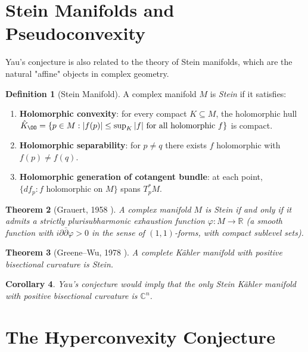 \documentclass[12pt,a4paper]{amsart}
\newtheorem{theorem}{Theorem}[section]
\newtheorem{corollary}[theorem]{Corollary}
\theoremstyle{definition}
\newtheorem{definition}[theorem]{Definition}
\theoremstyle{remark}
\newcommand{\CC}{\mathbb{C}}
\newcommand{\RR}{\mathbb{R}}
\newcommand{\dd}{\partial}
\begin{document}
\section{Stein Manifolds and Pseudoconvexity}

Yau's conjecture is also related to the theory of Stein manifolds, which are
the natural "affine" objects in complex geometry.

\begin{definition}[Stein Manifold]
A complex manifold $M$ is \emph{Stein} if it satisfies:
\begin{enumerate}[label=(\roman*)]
  \item \textbf{Holomorphic convexity}: for every compact $K \subseteq M$,
        the holomorphic hull $\hat K_\OO = \{p \in M : |f(p)| \le \sup_K |f|
        \text{ for all holomorphic } f\}$ is compact.
  \item \textbf{Holomorphic separability}: for $p \neq q$ there exists $f$
        holomorphic with $f(p) \neq f(q)$.
  \item \textbf{Holomorphic generation of cotangent bundle}: at each point,
        $\{df_p : f \text{ holomorphic on } M\}$ spans $T^*_p M$.
\end{enumerate}
\end{definition}

\begin{theorem}[Grauert, 1958 \cite{Grauert1958}]
A complex manifold $M$ is Stein if and only if it admits a strictly
plurisubharmonic exhaustion function $\varphi \colon M \to \RR$ (a smooth
function with $i\dd\bar\dd\varphi > 0$ in the sense of $(1,1)$-forms,
with compact sublevel sets).
\end{theorem}

\begin{theorem}[Greene--Wu, 1978 \cite{GreeneWu1978}]
A complete Kähler manifold with positive bisectional curvature is Stein.
\end{theorem}

\begin{corollary}
Yau's conjecture would imply that the only Stein Kähler manifold with
positive bisectional curvature is $\CC^n$.
\end{corollary}

\section{The Hyperconvexity Conjecture}
\end{document}
